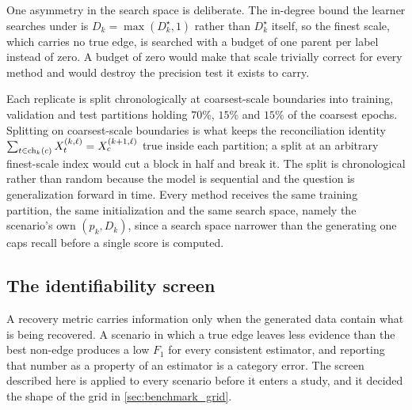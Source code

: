One asymmetry in the search space is deliberate. The in-degree bound the
learner searches under is \(D_k = \max(D_k^\star, 1)\) rather than
\(D_k^\star\) itself, so the finest scale, which carries no true edge, is
searched with a budget of one parent per label instead of zero. A budget of
zero would make that scale trivially correct for every method and would destroy
the precision test it exists to carry.

Each replicate is split chronologically at coarsest-scale boundaries into
training, validation and test partitions holding \(70\%\), \(15\%\) and
\(15\%\) of the coarsest epochs. Splitting on coarsest-scale boundaries is what
keeps the reconciliation identity
\(\sum_{t \in \operatorname{ch}_k(c)} X_t^{(k,\ell)} = X_c^{(k+1,\ell)}\) true inside each
partition; a split at an arbitrary finest-scale index would cut a block in half
and break it. The split is chronological rather than random because the model
is sequential and the question is generalization forward in time. Every method
receives the same training partition, the same initialization and the same
search space, namely the scenario's own \((p_k, D_k)\), since a search space
narrower than the generating one caps recall before a single score is computed.

\subsection{The identifiability screen}
\label{sec:benchmark_identifiability}

A recovery metric carries information only when the generated data contain what
is being recovered. A scenario in which a true edge leaves less evidence than
the best non-edge produces a low \(F_1\) for every consistent estimator, and
reporting that number as a property of an estimator is a category error. The
screen described here is applied to every scenario before it enters a study,
and it decided the shape of the grid in \cref{sec:benchmark_grid}.

